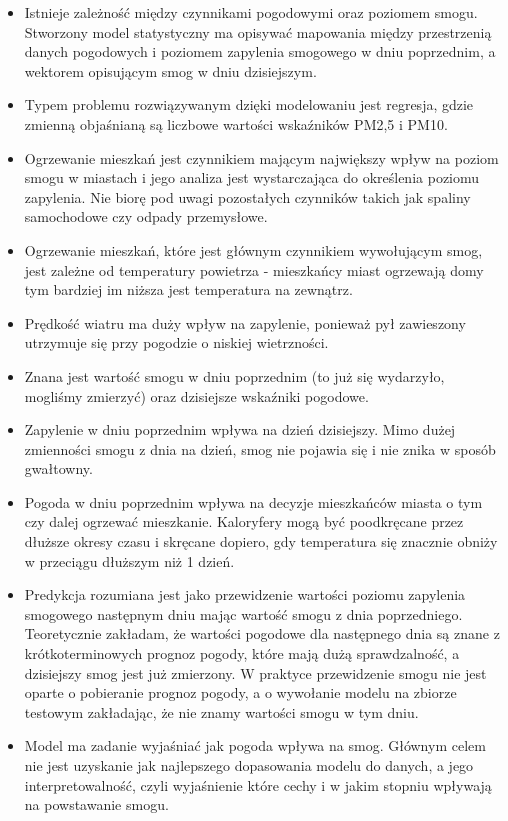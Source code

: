 \documentclass[a4paper,12pt,twoside,openany]{report}
\begin{document}
\begin{itemize}
	\item Istnieje zależność między czynnikami pogodowymi oraz poziomem smogu. Stworzony model statystyczny ma opisywać mapowania między przestrzenią danych pogodowych i poziomem zapylenia smogowego w dniu poprzednim, a wektorem opisującym smog w dniu dzisiejszym.
	
	\item Typem problemu rozwiązywanym dzięki modelowaniu jest regresja, gdzie zmienną objaśnianą są liczbowe wartości wskaźników PM2,5 i PM10.
	
	\item Ogrzewanie mieszkań jest czynnikiem mającym największy wpływ na poziom smogu w miastach i jego analiza jest wystarczająca do określenia poziomu zapylenia. Nie biorę pod uwagi pozostałych czynników takich jak spaliny samochodowe czy odpady przemysłowe.
	
	\item Ogrzewanie mieszkań, które jest głównym czynnikiem wywołującym smog, jest zależne od temperatury powietrza - mieszkańcy miast ogrzewają domy tym bardziej im niższa jest temperatura na zewnątrz.
	
	\item Prędkość wiatru ma duży wpływ na zapylenie, ponieważ pył zawieszony utrzymuje się przy pogodzie o niskiej wietrzności.
	
	\item Znana jest wartość smogu w dniu poprzednim (to już się wydarzyło, mogliśmy zmierzyć) oraz dzisiejsze wskaźniki pogodowe.
	
	\item Zapylenie w dniu poprzednim wpływa na dzień dzisiejszy. Mimo dużej zmienności smogu z dnia na dzień, smog nie pojawia się i nie znika w sposób gwałtowny.
	
	\item Pogoda w dniu poprzednim wpływa na decyzje mieszkańców miasta o tym czy dalej ogrzewać mieszkanie. Kaloryfery mogą być poodkręcane przez dłuższe okresy czasu i skręcane dopiero, gdy temperatura się znacznie obniży w przeciągu dłuższym niż 1 dzień.
	
	\item Predykcja rozumiana jest jako przewidzenie wartości poziomu zapylenia smogowego następnym dniu mając wartość smogu z dnia poprzedniego. Teoretycznie zakładam, że wartości pogodowe dla następnego dnia są znane z krótkoterminowych prognoz pogody, które mają dużą sprawdzalność, a dzisiejszy smog jest już zmierzony. W praktyce przewidzenie smogu nie jest oparte o pobieranie prognoz pogody, a o wywołanie modelu na zbiorze testowym zakładając, że nie znamy wartości smogu w tym dniu.
	
	\item Model ma zadanie wyjaśniać jak pogoda wpływa na smog. Głównym celem nie jest uzyskanie jak najlepszego dopasowania modelu do danych, a jego interpretowalność, czyli wyjaśnienie które cechy i w jakim stopniu wpływają na powstawanie smogu.
	
\end{itemize}
\end{document}
